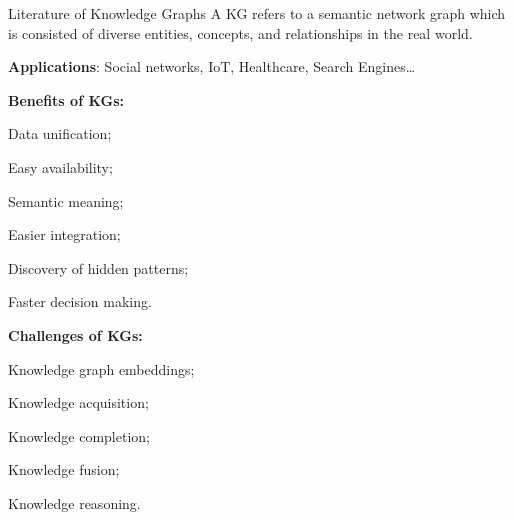 \begin{tframe}{Literature of Knowledge Graphs}
    A KG refers to a semantic network graph which is consisted of diverse entities, concepts, and relationships in the real world. %
    \vspace{0.2cm}

    \textbf{Applications}: Social networks, IoT, Healthcare, Search Engines\ldots
    \vspace{0.2cm}

    \begin{minipage}[t]{.5\linewidth}
        \textbf{Benefits of KGs:}
        \begin{adv}
            \item Data unification;
            \item Easy availability;
            \item Semantic meaning;
            \item Easier integration;
            \item Discovery of hidden patterns;
            \item Faster decision making.
        \end{adv}
    \end{minipage}%
    \hfill%
    \begin{minipage}[t]{.5\linewidth}
        \textbf{Challenges of KGs:}
        \begin{disadv}
            \item Knowledge graph embeddings;
            \item Knowledge acquisition;
            \item Knowledge completion;
            \item Knowledge fusion;
            \item Knowledge reasoning.
        \end{disadv}
    \end{minipage}
\end{tframe}
%

